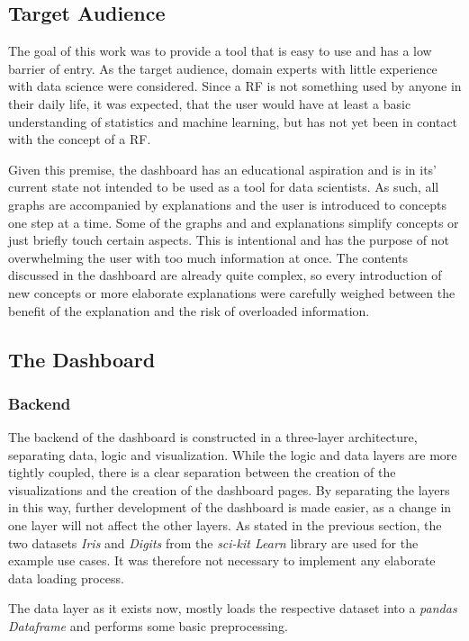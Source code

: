 \documentclass[a4paper, 12pt]{article}
\begin{document}
\subsection{Target Audience}
The goal of this work was to provide a tool that is easy to use and has a low barrier of entry.
As the target audience, domain experts with little experience with data science were considered.
Since a RF is not something used by anyone in their daily life, it was expected, that the user
would have at least a basic understanding of statistics and machine learning, but has not yet
been in contact with the concept of a RF. \par

Given this premise, the dashboard has an educational aspiration and is in its' current state
not intended to be used as a tool for data scientists. As such, all graphs are accompanied by
explanations and the user is introduced to concepts one step at a time. Some of the graphs and
and explanations simplify concepts or just briefly touch certain aspects. This is intentional
and has the purpose of not overwhelming the user with too much information at once. The contents
discussed in the dashboard are already quite complex, so every introduction of new concepts
or more elaborate explanations were carefully weighed between the benefit of the explanation
and the risk of overloaded information.

\subsection{The Dashboard}
\subsubsection{Backend}
The backend of the dashboard is constructed in a three-layer architecture, separating data,
logic and visualization. While the logic and data layers are more tightly coupled, there is
a clear separation between the creation of the visualizations and the creation of the
dashboard pages. By separating the layers in this way, further development of the dashboard is
made easier, as a change in one layer will not affect the other layers. As stated in the
previous section, the two datasets \textit{Iris} and \textit{Digits} from the
\textit{sci-kit Learn} library are used for the example use cases. It was therefore not
necessary to implement any elaborate data loading process. \par

The data layer as it exists now, mostly loads the respective dataset into a
\textit{pandas Dataframe} and performs some basic preprocessing. \par
\end{document}
